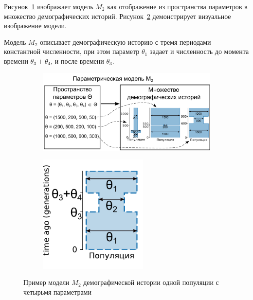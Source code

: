 \documentclass[a4paper,14pt,oneside,openany,article]{memoir}
\begin{document}
Рисунок~\ref{fig:model_def2_1} изображает модель $M_2$ как отображение из пространства параметров в множество
демографических историй.
Рисунок~\ref{fig:model_def2_2} демонстрирует визуальное изображение модели.

Модель $M_2$ описывает демографическую историю с тремя периодами константной численности, при этом параметр $\theta_1$ задает и численность до момента времени $\theta_3 + \theta_4$, и после времени $\theta_3$.

\begin{figure}[h]
    \centering
    \begin{subfigure}[b]{.59\textwidth}
    \includegraphics[width=\textwidth]{images_2/model_def_2.pdf}
    \caption{}
    \label{fig:model_def2_1}
    \end{subfigure}%
    \begin{subfigure}[b]{.40\textwidth}
    \centering
    \includegraphics[width=0.6\textwidth]{images_2/model_pict_2.pdf}
    \caption{}
    \label{fig:model_def2_2}
    \end{subfigure}
    \caption{Пример модели $M_2$ демографической истории одной популяции с четырьмя параметрами}
    \label{fig:model_def2}
\end{figure}
\end{document}
